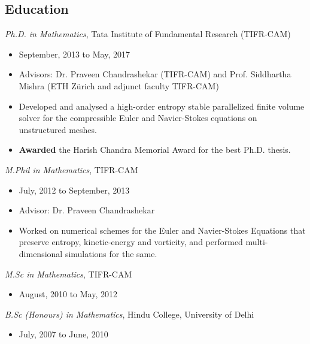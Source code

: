 \documentclass[margin]{res}
\begin{document}
\begin{resume}
\section{Education}
{\it Ph.D. in Mathematics}, Tata Institute of Fundamental Research (TIFR-CAM)
 \begin{itemize} \itemsep -2pt  %
 \item September, 2013 to May, 2017
 \item Advisors: Dr. Praveen Chandrashekar (TIFR-CAM) and Prof. Siddhartha Mishra (ETH Z\"{u}rich and adjunct faculty TIFR-CAM)
  \item Developed and analysed a high-order entropy stable parallelized finite volume solver for the compressible Euler and Navier-Stokes equations on unstructured meshes. 
  \item \textbf{Awarded} the Harish Chandra Memorial Award for the best Ph.D. thesis.
      
 \end{itemize}

 {\it M.Phil in Mathematics}, TIFR-CAM
 \begin{itemize} \itemsep -2pt  %
 \item July, 2012 to September, 2013
 \item Advisor: Dr. Praveen Chandrashekar
 \item Worked on numerical schemes for the Euler and Navier-Stokes Equations that preserve entropy, kinetic-energy and vorticity, and performed multi-dimensional simulations for the same.
 \end{itemize}

 {\it M.Sc in Mathematics}, TIFR-CAM
 \begin{itemize} \itemsep -2pt  %
 \item August, 2010 to May, 2012
 \end{itemize}
 
 {\it B.Sc (Honours) in Mathematics}, Hindu College, University of Delhi
 \begin{itemize} \itemsep -2pt  %
 \item July, 2007 to June, 2010
 \end{itemize}
 
% 


\end{resume}
\end{document}
